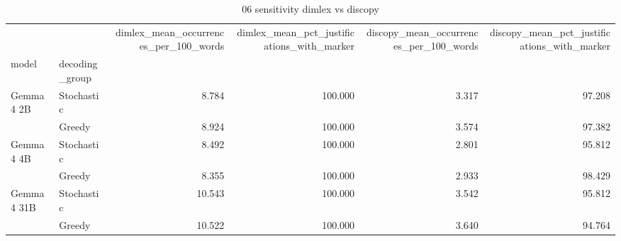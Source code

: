 \begin{table}
\caption{06 sensitivity dimlex vs discopy}
\begin{tabular}{llrrrr}
\toprule
 &  & dimlex\_mean\_occurrences\_per\_100\_words & dimlex\_mean\_pct\_justifications\_with\_marker & discopy\_mean\_occurrences\_per\_100\_words & discopy\_mean\_pct\_justifications\_with\_marker \\
model & decoding_group &  &  &  &  \\
\midrule
\multirow[t]{2}{*}{Gemma 4 2B} & Stochastic & 8.784 & 100.000 & 3.317 & 97.208 \\
 & Greedy & 8.924 & 100.000 & 3.574 & 97.382 \\
\cline{1-6}
\multirow[t]{2}{*}{Gemma 4 4B} & Stochastic & 8.492 & 100.000 & 2.801 & 95.812 \\
 & Greedy & 8.355 & 100.000 & 2.933 & 98.429 \\
\cline{1-6}
\multirow[t]{2}{*}{Gemma 4 31B} & Stochastic & 10.543 & 100.000 & 3.542 & 95.812 \\
 & Greedy & 10.522 & 100.000 & 3.640 & 94.764 \\
\cline{1-6}
\bottomrule
\end{tabular}
\end{table}
